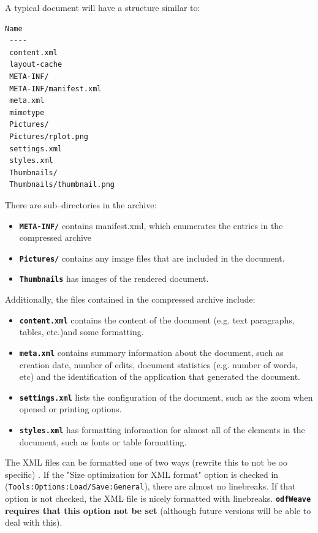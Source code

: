 \documentclass[12pt]{article}
\newcommand{\odfWeave}{{\tt odfWeave}\xspace}
\begin{document}
A typical document will have a structure similar to:
\begin{Verbatim}[samepage=true]
 Name
 ----
 content.xml
 layout-cache
 META-INF/
 META-INF/manifest.xml
 meta.xml
 mimetype
 Pictures/
 Pictures/rplot.png
 settings.xml
 styles.xml
 Thumbnails/
 Thumbnails/thumbnail.png
\end{Verbatim}

There are sub--directories in the archive:
\begin{itemize}
\item {\bf \tt META-INF/} contains manifest.xml, which enumerates the entries in the compressed archive
\item {\bf \tt Pictures/} contains any image files that are included in the document. 
\item {\bf \tt Thumbnails} has images of the rendered document.
\end{itemize}

Additionally, the files contained in the compressed archive include:
\begin{itemize}
\item {\bf \tt content.xml} contains the content of the document (e.g. text paragraphs, tables, etc.)and some formatting.
\item {\bf \tt meta.xml} contains summary information about the document, such as creation date, number of edits, document statistics (e.g. number of words, etc) and the identification of the application that generated the document.
\item {\bf \tt settings.xml} lists the configuration of the document, such as the zoom when opened or printing options.
\item {\bf \tt styles.xml} has formatting information for almost all of the elements in the document, such as fonts or table formatting.
\end{itemize}
The XML files can be formatted one of two ways (rewrite this to not be oo specific) . If the "Size optimization for XML format" option is checked in (\texttt{Tools:Options:Load/Save:General}), there are almost no linebreaks. If that option is not checked, the XML file is nicely formatted with linebreaks. {\bf \odfWeave  requires that this option not be set} (although future versions will be able to deal with this).
\end{document}
